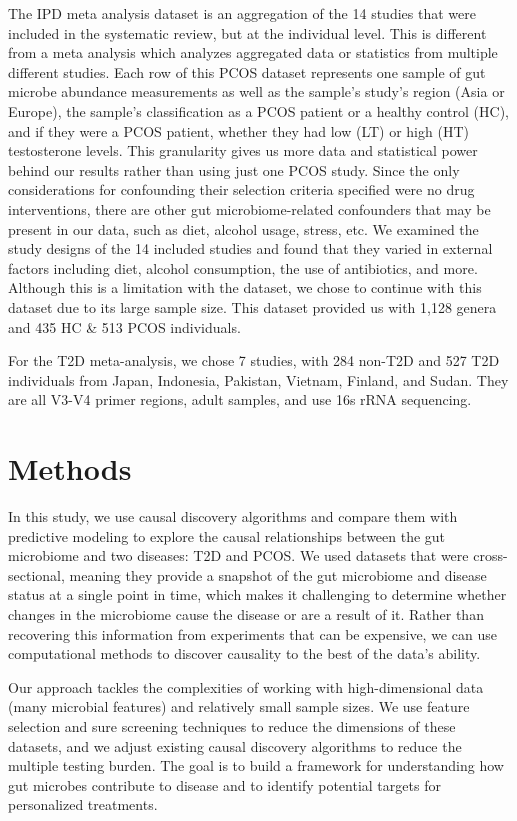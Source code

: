 \documentclass[12pt,letterpaper]{article}
\begin{document}
The IPD meta analysis dataset \citep{yang2024pcos} is an aggregation of the 14 studies that were included in the systematic review, but at the individual level. This is different from a meta analysis which analyzes aggregated data or statistics from multiple different studies. Each row of this PCOS dataset represents one sample of gut microbe abundance measurements as well as the sample’s study’s region (Asia or Europe), the sample’s classification as a PCOS patient or a healthy control (HC), and if they were a PCOS patient, whether they had low (LT) or high (HT) testosterone levels. This granularity gives us more data and statistical power behind our results rather than using just one PCOS study. Since the only considerations for confounding their selection criteria specified were no drug interventions, there are other gut microbiome-related confounders that may be present in our data, such as diet, alcohol usage, stress, etc. We examined the study designs of the 14 included studies and found that they varied in external factors including diet, alcohol consumption, the use of antibiotics, and more. Although this is a limitation with the dataset, we chose to continue with this dataset due to its large sample size. This dataset provided us with 1,128 genera and 435 HC \& 513 PCOS individuals. 

For the T2D meta-analysis, we chose 7 studies, with 284 non-T2D and 527 T2D individuals from Japan, Indonesia, Pakistan, Vietnam, Finland, and Sudan. They are all V3-V4 primer regions, adult samples, and use 16s rRNA sequencing.

\section{Methods}

In this study, we use causal discovery algorithms and compare them with predictive modeling to explore the causal relationships between the gut microbiome and two diseases: T2D and PCOS. We used datasets that were cross-sectional, meaning they provide a snapshot of the gut microbiome and disease status at a single point in time, which makes it challenging to determine whether changes in the microbiome cause the disease or are a result of it. Rather than recovering this information from experiments that can be expensive, we can use computational methods to discover causality to the best of the data’s ability. 

Our approach tackles the complexities of working with high-dimensional data (many microbial features) and relatively small sample sizes. We use feature selection and sure screening techniques to reduce the dimensions of these datasets, and we adjust existing causal discovery algorithms to reduce the multiple testing burden. The goal is to build a framework for understanding how gut microbes contribute to disease and to identify potential targets for personalized treatments.  
\end{document}
